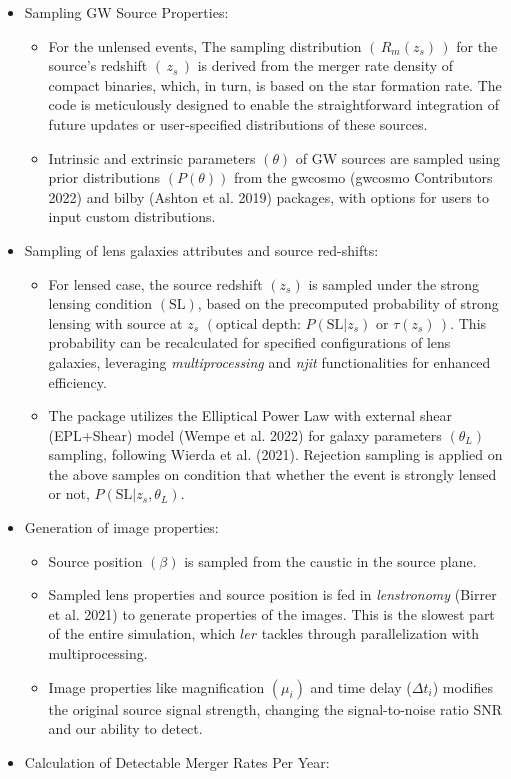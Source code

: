 \documentclass[10pt,a4paper,onecolumn]{article}
\providecommand{\tightlist}{%
  \setlength{\itemsep}{0pt}\setlength{\parskip}{0pt}}
\begin{document}
\begin{itemize}
\tightlist
\item
  Sampling GW Source Properties:

  \begin{itemize}
  \tightlist
  \item
    For the unlensed events, The sampling distribution
    \((\,R_m(z_s)\,)\) for the source's redshift \((\,z_s\,)\) is
    derived from the merger rate density of compact binaries, which, in
    turn, is based on the star formation rate. The code is meticulously
    designed to enable the straightforward integration of future updates
    or user-specified distributions of these sources.
  \item
    Intrinsic and extrinsic parameters \((\theta)\) of GW sources are
    sampled using prior distributions \((P(\theta))\) from the gwcosmo
    (gwcosmo Contributors 2022) and bilby (Ashton et al. 2019) packages,
    with options for users to input custom distributions.
  \end{itemize}
\item
  Sampling of lens galaxies attributes and source red-shifts:

  \begin{itemize}
  \tightlist
  \item
    For lensed case, the source redshift \((z_s)\) is sampled under the
    strong lensing condition \((\text{SL})\), based on the precomputed
    probability of strong lensing with source at \(z_s\)
    \((\text{optical depth: }P\left(\text{SL}|z_s\right) \text{ or }\tau(z_s)\,)\).
    This probability can be recalculated for specified configurations of
    lens galaxies, leveraging \emph{multiprocessing} and \emph{njit}
    functionalities for enhanced efficiency.
  \item
    The package utilizes the Elliptical Power Law with external shear
    (EPL+Shear) model (Wempe et al. 2022) for galaxy parameters
    \((\theta_L)\) sampling, following Wierda et al. (2021). Rejection
    sampling is applied on the above samples on condition that whether
    the event is strongly lensed or not,
    \(P\left(\text{SL}|z_s,\theta_L\right)\).
  \end{itemize}
\item
  Generation of image properties:

  \begin{itemize}
  \tightlist
  \item
    Source position \((\beta)\) is sampled from the caustic in the
    source plane.
  \item
    Sampled lens properties and source position is fed in
    \emph{lenstronomy} (Birrer et al. 2021) to generate properties of
    the images. This is the slowest part of the entire simulation, which
    \(ler\) tackles through parallelization with multiprocessing.
  \item
    Image properties like magnification \((\mu_i)\) and time delay
    (\(\Delta t_i\)) modifies the original source signal strength,
    changing the signal-to-noise ratio SNR and our ability to detect.
  \end{itemize}
\item
  Calculation of Detectable Merger Rates Per Year:


\end{itemize}
\end{document}
